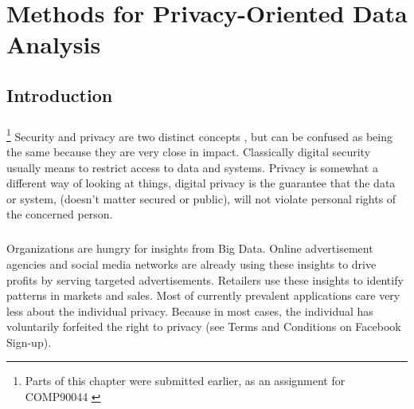 \documentclass[12pt]{report}
\theoremstyle{named}
\begin{document}

\chapter{Methods for Privacy-Oriented Data Analysis}
\label{chap:PrivacyDataTechniques}
\section{Introduction}
\paragraph{}
\footnote{Parts of this chapter were submitted earlier, as an assignment for COMP90044 \cite{ReserachMethodsLitReview}} Security and privacy are two distinct concepts \cite{spencer2001security}, but can be confused as being the same because they are very close in impact. Classically digital security usually means to restrict access to data and systems. Privacy is somewhat a different way of looking at things, digital privacy is the guarantee that the data or system, (doesn't matter secured or public), will not violate personal rights of the concerned person.

\paragraph{}
Organizations are hungry for insights from Big Data. Online advertisement agencies and social media networks are already using these insights to drive profits by serving targeted advertisements. Retailers use these insights to identify patterns in markets and sales. Most of currently prevalent applications care very less about the individual privacy. Because in most cases, the individual has voluntarily forfeited the right to privacy (see Terms and Conditions on Facebook Sign-up).
\end{document}
